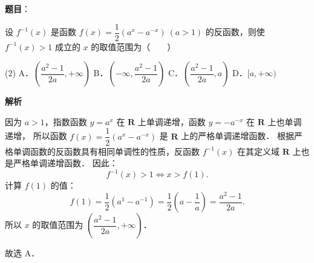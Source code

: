 \begin{answer}

\textbf{题目}：

设 $f^{-1}(x)$ 是函数 $f(x) = \dfrac{1}{2}(a^x - a^{-x})\ (a > 1)$ 的反函数，则使 $f^{-1}(x) > 1$ 成立的 $x$ 的取值范围为\mbox{（　　）}

\begin{gkopts}(2)
\task A．$\left(\dfrac{a^2 - 1}{2a}, +\infty\right)$
\task B．$\left(-\infty, \dfrac{a^2 - 1}{2a}\right)$
\task C．$\left(\dfrac{a^2 - 1}{2a}, a\right)$
\task D．$[a, +\infty)$
\end{gkopts}

\textbf{解析}

因为 $a > 1$，指数函数 $y = a^x$ 在 $\mathbf{R}$ 上单调递增，函数 $y = -a^{-x}$ 在 $\mathbf{R}$ 上也单调递增，
所以函数 $f(x) = \dfrac{1}{2}(a^x - a^{-x})$ 是 $\mathbf{R}$ 上的严格单调递增函数．
根据严格单调函数的反函数具有相同单调性的性质，反函数 $f^{-1}(x)$ 在其定义域 $\mathbf{R}$ 上也是严格单调递增函数．
因此：
\nopagebreak[4]
\[
f^{-1}(x) > 1 \iff x > f(1).
\]
计算 $f(1)$ 的值：
\nopagebreak[4]
\[
f(1) = \dfrac{1}{2}(a^1 - a^{-1}) = \dfrac{1}{2}\left(a - \dfrac{1}{a}\right) = \dfrac{a^2 - 1}{2a}.
\]
所以 $x$ 的取值范围为 $\left(\dfrac{a^2 - 1}{2a}, +\infty\right)$．

故选 A．


\end{answer}
